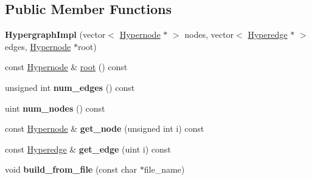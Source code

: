 \subsection*{Public Member Functions}
\begin{DoxyCompactItemize}
\item 
\hypertarget{class_scarab_1_1_h_g_1_1_hypergraph_impl_a935bed9b8cf9235a1adb61d0889f6ac7}{
{\bfseries HypergraphImpl} (vector$<$ \hyperlink{class_scarab_1_1_h_g_1_1_hypernode}{Hypernode} $\ast$ $>$ nodes, vector$<$ \hyperlink{class_scarab_1_1_h_g_1_1_hyperedge}{Hyperedge} $\ast$ $>$ edges, \hyperlink{class_scarab_1_1_h_g_1_1_hypernode}{Hypernode} $\ast$root)}
\label{class_scarab_1_1_h_g_1_1_hypergraph_impl_a935bed9b8cf9235a1adb61d0889f6ac7}

\item 
const \hyperlink{class_scarab_1_1_h_g_1_1_hypernode}{Hypernode} \& \hyperlink{class_scarab_1_1_h_g_1_1_hypergraph_impl_a31172009b97d179f6b1199f191197a32}{root} () const 
\item 
\hypertarget{class_scarab_1_1_h_g_1_1_hypergraph_impl_a0adcc8783b94cbe07b092220082d00ab}{
unsigned int {\bfseries num\_\-edges} () const }
\label{class_scarab_1_1_h_g_1_1_hypergraph_impl_a0adcc8783b94cbe07b092220082d00ab}

\item 
\hypertarget{class_scarab_1_1_h_g_1_1_hypergraph_impl_ad39e917a84acb1d4caf0145ce8a903a2}{
uint {\bfseries num\_\-nodes} () const }
\label{class_scarab_1_1_h_g_1_1_hypergraph_impl_ad39e917a84acb1d4caf0145ce8a903a2}

\item 
\hypertarget{class_scarab_1_1_h_g_1_1_hypergraph_impl_a9276a6faa074eb4f3bbb2f8b8d5d4fbf}{
const \hyperlink{class_scarab_1_1_h_g_1_1_hypernode}{Hypernode} \& {\bfseries get\_\-node} (unsigned int i) const }
\label{class_scarab_1_1_h_g_1_1_hypergraph_impl_a9276a6faa074eb4f3bbb2f8b8d5d4fbf}

\item 
\hypertarget{class_scarab_1_1_h_g_1_1_hypergraph_impl_a31a148139b888b6bd10e78fe555144c7}{
const \hyperlink{class_scarab_1_1_h_g_1_1_hyperedge}{Hyperedge} \& {\bfseries get\_\-edge} (uint i) const }
\label{class_scarab_1_1_h_g_1_1_hypergraph_impl_a31a148139b888b6bd10e78fe555144c7}

\item 
\hypertarget{class_scarab_1_1_h_g_1_1_hypergraph_impl_a1f33418f90b826db9cfc0bb34e1ca9cf}{
void {\bfseries build\_\-from\_\-file} (const char $\ast$file\_\-name)}
\label{class_scarab_1_1_h_g_1_1_hypergraph_impl_a1f33418f90b826db9cfc0bb34e1ca9cf}


\end{DoxyCompactItemize}
